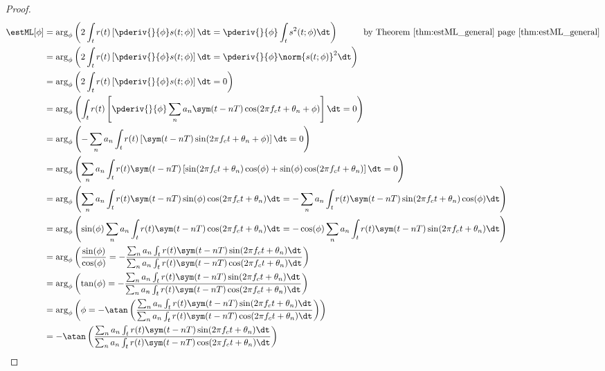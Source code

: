 {\begin{proof}
\begin{align*}
   \estML[\phi]
     &=    \arg_\phi\left(
            2\int_t r(t)\left[\pderiv{}{\phi}s(t;\phi)\right] \dt =
            \pderiv{}{\phi}\int_t s^2(t;\phi) \dt
            \right)
            \hspace{1cm}\mbox{by Theorem~\ref{thm:estML_general} page~\pageref{thm:estML_general}}
   \\&=    \arg_\phi\left(
            2\int_t r(t)\left[\pderiv{}{\phi}s(t;\phi)\right] \dt =
            \pderiv{}{\phi}\norm{s(t;\phi)}^2 \dt
            \right)
   \\&=    \arg_\phi\left(
            2\int_t r(t)\left[\pderiv{}{\phi}s(t;\phi)\right] \dt = 0
            \right)
   \\&=    \arg_\phi\left(
            \int_t r(t)\left[\pderiv{}{\phi}\sum_n a_n \sym(t-nT)\cos(2\pi f_ct+\theta_n+\phi)\right] \dt = 0
            \right)
   \\&=    \arg_\phi\left(
            -\sum_n a_n \int_t r(t)\left[\sym(t-nT)\sin(2\pi f_ct+\theta_n+\phi)\right] \dt = 0
            \right)
   \\&=    \arg_\phi\left(
            \sum_n a_n \int_t r(t)\sym(t-nT)\left[
            \sin(2\pi f_ct+\theta_n)\cos(\phi) +
            \sin(\phi)\cos(2\pi f_ct+\theta_n)
            \right] \dt = 0
            \right)
   \\&=    \arg_\phi\left(
            \sum_n a_n \int_t r(t)\sym(t-nT)
            \sin(\phi)\cos(2\pi f_ct+\theta_n) \dt
            = -
            \sum_n a_n \int_t r(t)\sym(t-nT)
            \sin(2\pi f_ct+\theta_n)\cos(\phi) \dt
            \right)
   \\&=    \arg_\phi\left(
            \sin(\phi)\sum_n a_n \int_t r(t)\sym(t-nT)
            \cos(2\pi f_ct+\theta_n) \dt
            = -
            \cos(\phi)\sum_n a_n \int_t r(t)\sym(t-nT)
            \sin(2\pi f_ct+\theta_n) \dt
            \right)
   \\&=    \arg_\phi\left(
            \frac{\sin(\phi)}{\cos(\phi)}
            =-
            \frac{\sum_n a_n \int_t r(t)\sym(t-nT)\sin(2\pi f_ct+\theta_n) \dt}
                 {\sum_n a_n \int_t r(t)\sym(t-nT)\cos(2\pi f_ct+\theta_n) \dt}
            \right)
   \\&=    \arg_\phi\left(
            \tan(\phi)
            =-
            \frac{\sum_n a_n \int_t r(t)\sym(t-nT)\sin(2\pi f_ct+\theta_n) \dt}
                 {\sum_n a_n \int_t r(t)\sym(t-nT)\cos(2\pi f_ct+\theta_n) \dt}
            \right)
   \\&=    \arg_\phi\left(
            \phi =-\atan\left(
            \frac{\sum_n a_n \int_t r(t)\sym(t-nT)\sin(2\pi f_ct+\theta_n) \dt}
                 {\sum_n a_n \int_t r(t)\sym(t-nT)\cos(2\pi f_ct+\theta_n) \dt}
            \right)
            \right)
   \\&=    -\atan\left(
            \frac{\sum_n a_n \int_t r(t)\sym(t-nT)\sin(2\pi f_ct+\theta_n) \dt}
                 {\sum_n a_n \int_t r(t)\sym(t-nT)\cos(2\pi f_ct+\theta_n) \dt}
            \right)
\end{align*}
\end{proof}




}
